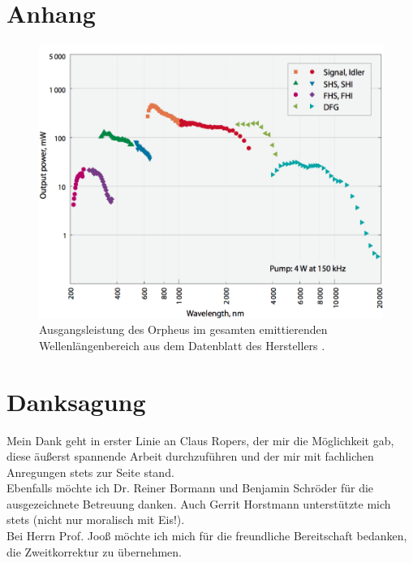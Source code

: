 \documentclass[bachelor,       %
               twoside,        %
               BCOR10mm,       %
               english,ngerman, %
               final,          %
               ]{GAUBM}
\begin{document}
\appendix

\chapter{Anhang}
\begin{figure}[h]
	\centering
	\includegraphics[width=0.7\linewidth]{Orpheus_Tuning_Curve}
	\caption{Ausgangsleistung des Orpheus im gesamten emittierenden Wellenlängenbereich aus dem Datenblatt des Herstellers \protect\footnotemark.}
	\label{fig:orpheus_tuningcurve}
\end{figure}

\cleardoublepage


\chapter*{Danksagung}
Mein Dank geht in erster Linie an Claus Ropers, der mir die Möglichkeit gab, diese äußerst spannende Arbeit durchzuführen und der mir mit fachlichen Anregungen stets zur Seite stand.\\

Ebenfalls möchte ich Dr. Reiner Bormann und Benjamin Schröder für die ausgezeichnete Betreuung danken.
Auch Gerrit Horstmann unterstützte mich stets (nicht nur moralisch mit Eis!).\\

Bei Herrn Prof. Jooß möchte ich mich für die freundliche Bereitschaft bedanken, die Zweitkorrektur zu übernehmen.\\
\end{document}
